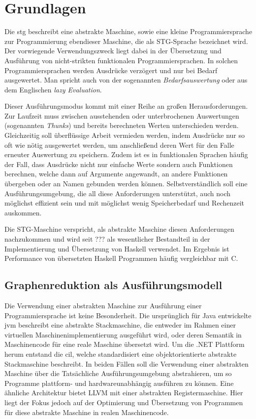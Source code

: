 
\chapter{Grundlagen}\label{chap:grundlagen}

Die \gls{stg} beschreibt eine abstrakte Maschine, sowie eine kleine Programmiersprache zur Programmierung ebendieser Maschine, die als STG-Sprache bezeichnet wird.
Der vorwiegende Verwendungszweck liegt dabei in der Übersetzung und Ausführung von nicht-strikten funktionalen Programmiersprachen.
In solchen Programmiersprachen werden Ausdrücke verzögert und nur bei Bedarf ausgewertet.
Man spricht auch von der sogenannten \textit{Bedarfsauswertung} oder aus dem Englischen \textit{lazy Evaluation}.

Dieser Ausführungsmodus kommt mit einer Reihe an großen Herausforderungen.
Zur Laufzeit muss zwischen ausstehenden oder unterbrochenen Auswertungen (sogenannten \textit{Thunks}) und bereits berechneten Werten unterschieden werden.
Gleichzeitig soll überflüssige Arbeit vermieden werden, indem Ausdrücke nur so oft wie nötig ausgewertet werden, um anschließend deren Wert für den Falle erneuter Auswertung zu speichern.
Zudem ist es in funktionalen Sprachen häufig der Fall, dass Ausdrücke nicht nur einfache Werte sondern auch Funktionen berechnen, welche dann auf Argumente angewandt, an andere Funktionen übergeben oder an Namen gebunden werden können.
Selbstverständlich soll eine Ausführungsumgebung, die all diese Anforderungen unterstützt, auch noch möglichst effizient sein und mit möglichst wenig Speicherbedarf und Rechenzeit auskommen.

Die STG-Maschine verspricht, als abstrakte Maschine diesen Anforderungen nachzukommen und wird seit ??? als  wesentlicher Bestandteil in der Implementierung und Übersetzung von Haskell verwendet.
Im Ergebnis ist Performance von übersetzten Haskell Programmen häufig vergleichbar mit C.\cn{}


\section{Graphenreduktion als Ausführungsmodell}

Die Verwendung einer abstrakten Maschine zur Ausführung einer Programmiersprache ist keine Besonderheit.
Die ursprünglich für Java entwickelte \gls{jvm} beschreibt eine abstrakte Stackmaschine, die entweder im Rahmen einer virtuellen Maschinenimplementierung ausgeführt wird, oder deren Semantik in Maschinencode für eine reale Maschine übersetzt wird.
Um die .NET Plattform herum entstand die \gls{cil}, welche standardisiert eine objektorientierte abstrakte Stackmaschine beschreibt.
In beiden Fällen soll die Verwendung einer abstrakten Maschine über die Tatsächliche Ausführungsumgebung abstrahieren, um so Programme plattform- und hardwareunabhängig ausführen zu können.
Eine ähnliche Architektur bietet LLVM mit einer abstrakten Registermaschine.
Hier liegt der Fokus jedoch auf der Optimierung und Übersetzung von Programmen für diese abstrakte Maschine in realen Maschinencode.

